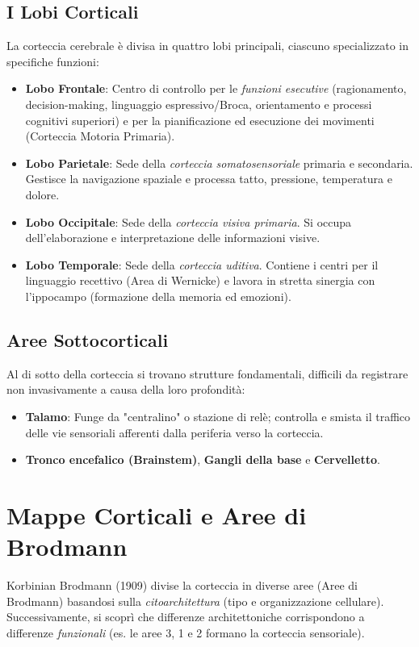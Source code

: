 \subsection{I Lobi Corticali}
La corteccia cerebrale è divisa in quattro lobi principali, ciascuno specializzato in specifiche funzioni:
\begin{itemize}
    \item \textbf{Lobo Frontale}: Centro di controllo per le \textit{funzioni esecutive} (ragionamento, decision-making, linguaggio espressivo/Broca, orientamento e processi cognitivi superiori) e per la pianificazione ed esecuzione dei movimenti (Corteccia Motoria Primaria).
    \item \textbf{Lobo Parietale}: Sede della \textit{corteccia somatosensoriale} primaria e secondaria. Gestisce la navigazione spaziale e processa tatto, pressione, temperatura e dolore.
    \item \textbf{Lobo Occipitale}: Sede della \textit{corteccia visiva primaria}. Si occupa dell'elaborazione e interpretazione delle informazioni visive.
    \item \textbf{Lobo Temporale}: Sede della \textit{corteccia uditiva}. Contiene i centri per il linguaggio recettivo (Area di Wernicke) e lavora in stretta sinergia con l'ippocampo (formazione della memoria ed emozioni).
\end{itemize}

\subsection{Aree Sottocorticali}
Al di sotto della corteccia si trovano strutture fondamentali, difficili da registrare non invasivamente a causa della loro profondità:
\begin{itemize}
    \item \textbf{Talamo}: Funge da "centralino" o stazione di relè; controlla e smista il traffico delle vie sensoriali afferenti dalla periferia verso la corteccia.
    \item \textbf{Tronco encefalico (Brainstem)}, \textbf{Gangli della base} e \textbf{Cervelletto}.
\end{itemize}

\section{Mappe Corticali e Aree di Brodmann}
Korbinian Brodmann (1909) divise la corteccia in diverse aree (Aree di Brodmann) basandosi sulla \textit{citoarchitettura} (tipo e organizzazione cellulare). Successivamente, si scoprì che differenze architettoniche corrispondono a differenze \textit{funzionali} (es. le aree 3, 1 e 2 formano la corteccia sensoriale).

